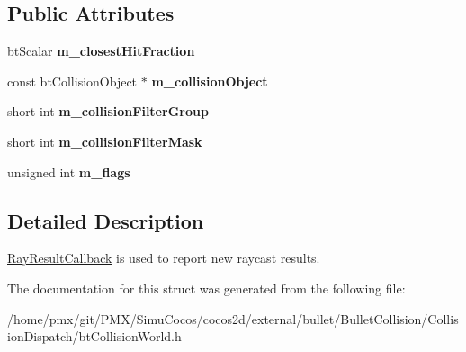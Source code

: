 \subsection*{Public Attributes}
\begin{DoxyCompactItemize}
\item 
\mbox{\label{structbtCollisionWorld_1_1RayResultCallback_a2218c203bbea335f75f89e8306490af0}} 
bt\+Scalar {\bfseries m\+\_\+closest\+Hit\+Fraction}
\item 
\mbox{\label{structbtCollisionWorld_1_1RayResultCallback_a3432640f56261f4186aa3ffbdd933cb0}} 
const bt\+Collision\+Object $\ast$ {\bfseries m\+\_\+collision\+Object}
\item 
\mbox{\label{structbtCollisionWorld_1_1RayResultCallback_ade19984f0d4cdaf9b0e53062d8c5552d}} 
short int {\bfseries m\+\_\+collision\+Filter\+Group}
\item 
\mbox{\label{structbtCollisionWorld_1_1RayResultCallback_ab958e40e9ae9cb76659b1f357a8e2a41}} 
short int {\bfseries m\+\_\+collision\+Filter\+Mask}
\item 
\mbox{\label{structbtCollisionWorld_1_1RayResultCallback_ae2e70d1f7f07be17924a0f8f5b28f2c5}} 
unsigned int {\bfseries m\+\_\+flags}
\end{DoxyCompactItemize}


\subsection{Detailed Description}
\hyperlink{structbtCollisionWorld_1_1RayResultCallback}{Ray\+Result\+Callback} is used to report new raycast results. 

The documentation for this struct was generated from the following file\+:\begin{DoxyCompactItemize}
\item 
/home/pmx/git/\+P\+M\+X/\+Simu\+Cocos/cocos2d/external/bullet/\+Bullet\+Collision/\+Collision\+Dispatch/bt\+Collision\+World.\+h\end{DoxyCompactItemize}
